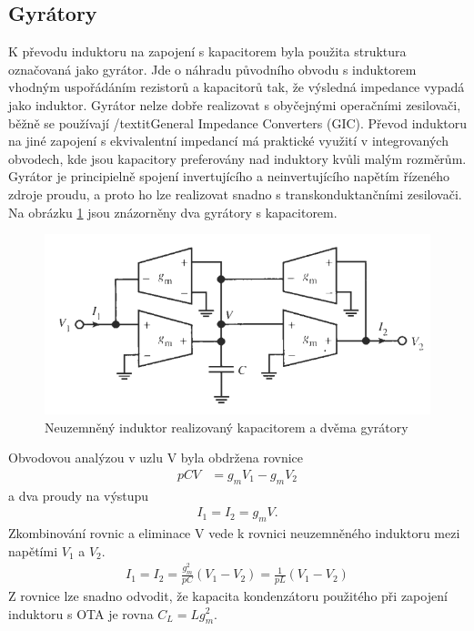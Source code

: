 \subsection{Gyrátory}\label{s:GYR}
\noindent K převodu induktoru na zapojení s kapacitorem byla použita struktura označovaná jako gyrátor. Jde o náhradu původního obvodu s induktorem vhodným uspořádáním rezistorů a kapacitorů tak, že výsledná impedance vypadá jako induktor. Gyrátor nelze dobře realizovat s obyčejnými operačními zesilovači, běžně se používají /textit{General Impedance Converters (GIC)}. Převod induktoru na jiné zapojení s ekvivalentní impedancí má praktické využití v integrovaných obvodech, kde jsou kapacitory preferovány nad induktory kvůli malým rozměrům. Gyrátor je principielně spojení invertujícího a neinvertujícího napětím řízeného zdroje proudu, a proto ho lze realizovat snadno s transkonduktančními zesilovači. Na obrázku \ref{s:GO} jsou znázorněny dva gyrátory s kapacitorem. 
\begin{figure}[h]
\centering
\includegraphics[scale=0.55]{gyrator.png}
\caption[Neuzemněný induktor realizovaný kapacitorem a dvěma gyrátory]{Neuzemněný induktor realizovaný kapacitorem a dvěma gyrátory \cite{12} \label{s:GO}}
\end{figure}
Obvodovou analýzou v uzlu V byla obdržena rovnice
\begin{align}
pCV &= g_mV_1 - g_mV_2
\end{align}
a dva proudy na výstupu
\begin{align}
I_1 = I_2 = g_mV.
\end{align}
Zkombinování rovnic a eliminace V vede k rovnici neuzemněného induktoru mezi napětími $V_1$ a $V_2$.
\begin{align}
I_1 = I_2 = \frac{g_m^2}{pC}(V_1 - V_2) = \frac{1}{pL}(V_1 - V_2)
\end{align}
Z rovnice lze snadno odvodit, že kapacita kondenzátoru použitého při zapojení induktoru s OTA je rovna $C_L = L g_m ^2$. \\
